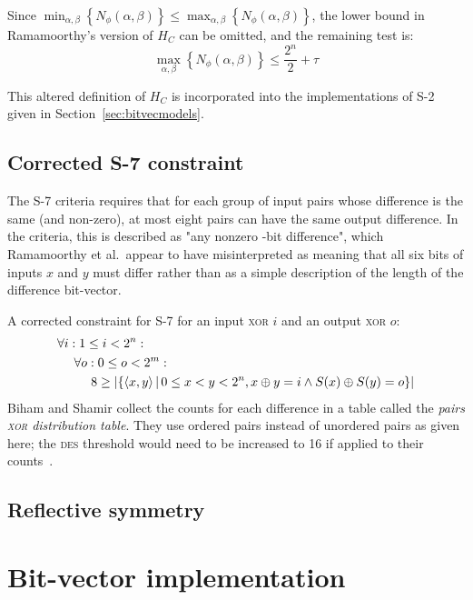 \documentclass[a4paper,10pt,twoside,openright]{book}
\renewcommand{\sc}[1]{\textsc{\lowercase{#1}}}
\renewcommand{\ln}[1]{{\fontsize{8pt}{8pt}\selectfont#1}}
\newcommand{\set}[1]{\left\{#1\right\}}
\newcommand{\suchthat}{\,\middle|\,}
\newcommand{\tuple}[1]{\left\langle #1\right\rangle}
\newcommand{\Nphi}{N_\phi(\alpha,\beta)}
\DeclarePairedDelimiter\Cardinality{\lvert}{\rvert}%
\begin{document}
Since $\min_{\alpha,\beta}\left\{\Nphi\right\} \leq \max_{\alpha,\beta}\left\{\Nphi\right\}$, 
the lower bound in Ramamoorthy's version of $H_C$ can be omitted, and the remaining test is:
\[\max_{\alpha,\beta}\left\{\Nphi\right\} \leq \frac{2^n}{2} + \tau\]

This altered definition of $H_C$ is incorporated into the implementations of S-2 given in Section~\ref{sec:bitvecmodels}.

\section{Corrected S-7 constraint}
\label{sec:ssevenfix}
The S-7 criteria requires that for each group of input pairs whose difference is the same (and non-zero), at most eight pairs can have the same output difference. In the criteria, this is described as "any nonzero \ln{6}-bit difference", which Ramamoorthy et al.\ appear to have misinterpreted as meaning that all six bits of inputs $x$ and $y$ must differ rather than as a simple description of the length of the difference bit-vector.

A corrected constraint for S-7 for an input \sc{XOR} $i$ and an output \sc{XOR} $o$:
\begin{align*}
    & \forall i : 1 \leq i < 2^n : \\
    & ~~~~ \forall o : 0 \leq o < 2^m : \\
    & ~~~~~~~~ %
    8 \geq
    \Cardinality{
        \set{
            \tuple{x,y}
            \suchthat
            0 \leq x < y < 2^n,
            x \oplus y = i \land
            S(x) \oplus S(y) = o
        }
    } 
\end{align*}
Biham and Shamir collect the counts for each difference in a table called the \textit{pairs \sc{xor} distribution table}.
They use ordered pairs instead of unordered pairs as given here; the \sc{DES} threshold would need to be increased to 16 if applied to their counts~\cite{biham}.

\section{Reflective symmetry}
\label{sec:symmetryreflection}


\chapter{Bit-vector implementation}
\label{sec:implementation}
\end{document}
